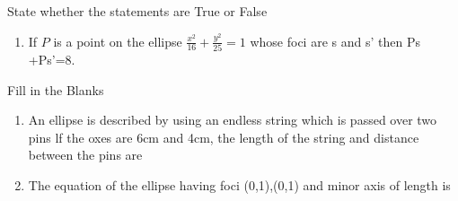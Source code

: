 State whether the statements are True or False 
\begin{enumerate}[label=\thesection.\arabic*,ref=\thesection.\theenumi,resume*]
\item If ${P}$ is a point on the ellipse $\frac{x^2}{16}+\frac{y^2}{25}=1$ whose foci  are s and s' then Ps +Ps'=8.
\end{enumerate}
Fill in the Blanks
\begin{enumerate}[label=\thesection.\arabic*,ref=\thesection.\theenumi,resume*]
\item An ellipse is described by using an endless string which is passed over two pins lf the oxes are 6cm and 4cm, the length of the string and distance between the pins are  \makebox[1cm]{\hrulefill}             
\item The equation of the ellipse having foci (0,1),(0,1) and minor axis of length is \makebox[1cm]{\hrulefill}                
\end{enumerate}
